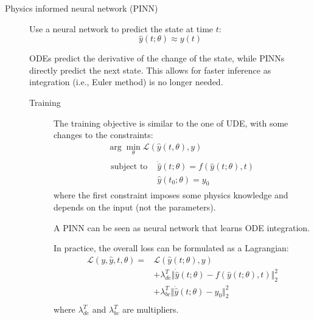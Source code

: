 \begin{description}
    \item[Physics informed neural network (PINN)] 
        Use a neural network to predict the state at time $t$:
        \[ \hat{y}(t; \theta) \approx y(t) \]

        \begin{remark}
            ODEs predict the derivative of the change of the state, while PINNs directly predict the next state. This allows for faster inference as integration (i.e., Euler method) is no longer needed.
        \end{remark}

        \begin{description}
            \item[Training]
                The training objective is similar to the one of UDE, with some changes to the constraints:
                \[
                    \begin{gathered}
                        \arg\min_\theta \mathcal{L}(\hat{y}(t, \theta), y) \\
                        \begin{split}
                            \text{subject to }& \dot{\hat{y}}(t; \theta) = f(\hat{y}(t; \theta), t) \\
                            & \hat{y}(t_0; \theta) = y_0
                        \end{split}
                    \end{gathered}
                \]
                where the first constraint imposes some physics knowledge and depends on the input (not the parameters).

                \begin{remark}
                    A PINN can be seen as neural network that learns ODE integration.
                \end{remark}

                In practice, the overall loss can be formulated as a Lagrangian:
                \[ 
                    \begin{split}
                        \mathcal{L}(y, \hat{y}, t, \theta) = &\mathcal{L}(\hat{y}(t; \theta), y) \\
                        &+ \lambda_{de}^T \Vert \dot{\hat{y}}(t; \theta) - f(\hat{y}(t; \theta), t) \Vert^2_2 \\
                        &+ \lambda_{bc}^T \Vert \dot{\hat{y}}(t; \theta) - y_0 \Vert^2_2 \\
                    \end{split}
                \]
                where $\lambda_{de}^T$ and $\lambda_{bc}^T$ are multipliers.


\end{description}
\end{description}
